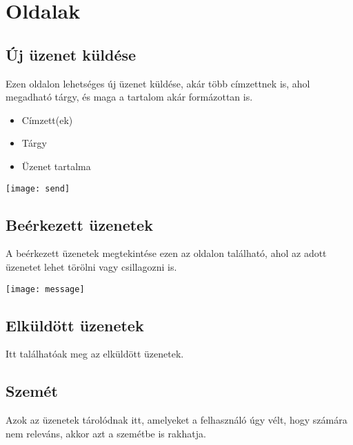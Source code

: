 ﻿\chapter{Oldalak}

\section{Új üzenet küldése}
\begin{flushleft}
    Ezen oldalon lehetséges új üzenet küldése, akár több címzettnek is, ahol megadható tárgy, és maga a tartalom akár formázottan is.
\end{flushleft}
\begin{minipage}[h]{0.3\textwidth}
    \begin{itemize}
       \item Címzett(ek)
       \item Tárgy
       \item Üzenet tartalma
    \end{itemize}
\end{minipage}%
\begin{minipage}[h]{0.7\textwidth}
    \begin{center}
        \texttt{[image: send]}
    \end{center}
\end{minipage}%

\section{Beérkezett üzenetek}
\begin{flushleft}
    A beérkezett üzenetek megtekintése ezen az oldalon található, ahol az adott üzenetet lehet törölni vagy csillagozni is.
\end{flushleft}
\begin{center}
    \texttt{[image: message]}
\end{center}

\section{Elküldött üzenetek}
\begin{flushleft}
    Itt találhatóak meg az elküldött üzenetek.
\end{flushleft}

\section{Szemét}
\begin{flushleft}
    Azok az üzenetek tárolódnak itt, amelyeket a felhasználó úgy vélt, hogy számára nem releváns, akkor azt a szemétbe is rakhatja.
\end{flushleft}

